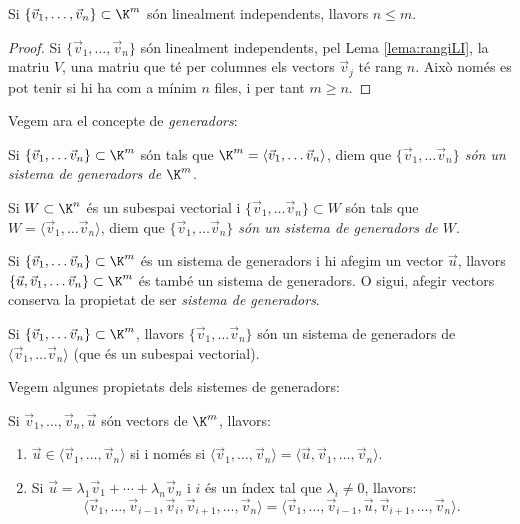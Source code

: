  \begin{corollari}\label{cor:maximLI}
     Si $\{\vec v_1, \dots, \vec v_n\}\subset \K^m$ són linealment independents, llavors $n\leq m$. 
 \end{corollari}
 \begin{proof}
    Si $\{\vec v_1, \dots, \vec v_n\}$ són linealment independents, pel Lema \ref{lema:rangiLI}, la matriu $V$, una matriu que té per columnes els vectors $\vec v_j$ té rang $n$. Això només es pot tenir si hi ha com a mínim $n$ files, i per tant $m\geq n$.
\end{proof}


Vegem ara el concepte de \emph{generadors}:
\begin{definicio}\label{def:sistgen}
	Si $\{\vec v_1, \dots \vec v_n\}\subset \K^m$ són tals que $\K^m=\langle \vec v_1, \dots \vec v_n\rangle$, diem que \emph{$\{\vec v_1, \dots \vec v_n\}$ són un sistema de generadors de $\K^m$}.
	
	Si $W\subset \K^n$ és un subespai vectorial i $\{\vec v_1, \dots \vec v_n\}\subset W$ són tals que $W=\langle \vec v_1, \dots \vec v_n\rangle$, diem que \emph{$\{\vec v_1, \dots \vec v_n\}$ són un sistema de generadors de $W$}.
\end{definicio}
\begin{observacio}\label{obs:sisgen}
	Si $\{\vec v_1, \dots \vec v_n\}\subset \K^m$ és un sistema de generadors i hi afegim un vector $\vec u$, llavors $\{\vec u,\vec v_1, \dots \vec v_n\}\subset \K^m$ és també un sistema de generadors. O sigui, afegir vectors conserva la propietat de ser \emph{sistema de generadors}.
\end{observacio}
\begin{observacio}
	Si $\{\vec v_1, \dots \vec v_n\}\subset \K^m$, llavors $\{\vec v_1, \dots \vec v_n\}$ són un sistema de generadors de $\langle \vec v_1, \dots \vec v_n\rangle$ (que és un subespai vectorial).
\end{observacio}
Vegem algunes propietats dels sistemes de generadors:
\begin{lema}\label{lem:generadors}
	Si $\vec v_1, \dots , \vec v_n, \vec u$ són vectors de $\K^m$, llavors:
	\begin{enumerate}[\rm (a)]
		\item $\vec u\in \langle \vec v_1, \dots , \vec v_n \rangle$ si i només si $\langle \vec v_1, \dots , \vec v_n \rangle=\langle\vec u, \vec v_1, \dots , \vec v_n \rangle$.
		\item Si $\vec u = \lambda_1 \vec v_1 + \cdots + \lambda_n \vec v_n$ i $i$ és un índex tal que $\lambda_i\neq 0$, llavors:
		$$\langle \vec v_1,\dots,\vec v_{i-1},\vec v_i , \vec v_{i+1}, \dots , \vec v_n\rangle=\langle \vec v_1, \dots,\vec v_{i-1},\vec u , \vec v_{i+1},\dots,\vec v_n\rangle.$$ 
	\end{enumerate}
\end{lema}
